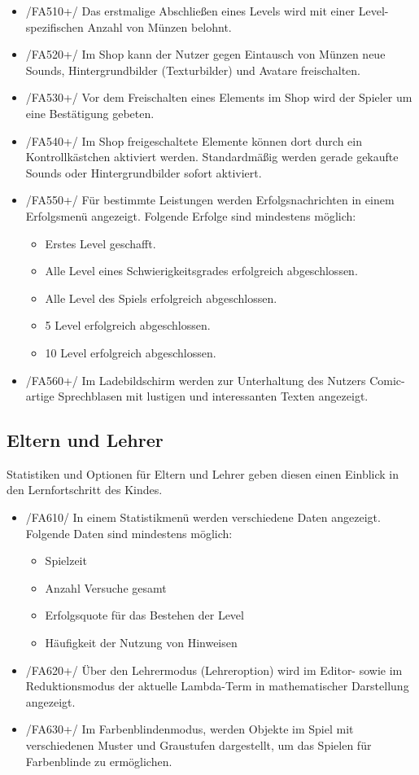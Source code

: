 \begin{itemize}
\item /FA510+/ Das erstmalige Abschließen eines Levels wird mit einer Level-spezifischen Anzahl von Münzen belohnt.
\item /FA520+/ Im Shop kann der Nutzer gegen Eintausch von Münzen neue Sounds, Hintergrundbilder (Texturbilder) und Avatare freischalten.
\item /FA530+/ Vor dem Freischalten eines Elements im Shop wird der Spieler um eine Bestätigung gebeten.
\item /FA540+/ Im Shop freigeschaltete Elemente können dort durch ein Kontrollkästchen aktiviert werden. Standardmäßig werden gerade gekaufte Sounds oder Hintergrundbilder sofort aktiviert.
\item /FA550+/ Für bestimmte Leistungen werden Erfolgsnachrichten in einem Erfolgsmenü angezeigt. Folgende Erfolge sind mindestens möglich:
\begin{itemize}
\item Erstes Level geschafft.
\item Alle Level eines Schwierigkeitsgrades erfolgreich abgeschlossen.
\item Alle Level des Spiels erfolgreich abgeschlossen.
\item 5 Level erfolgreich abgeschlossen.
\item 10 Level erfolgreich abgeschlossen.
\end{itemize}
\item /FA560+/ Im Ladebildschirm werden zur Unterhaltung des Nutzers Comic-artige Sprechblasen mit lustigen und interessanten Texten angezeigt.
\end{itemize}

\subsection{Eltern und Lehrer}

Statistiken und Optionen für Eltern und Lehrer geben diesen einen Einblick in den Lernfortschritt des Kindes.

\begin{itemize}
\item /FA610/ In einem Statistikmenü werden verschiedene Daten angezeigt. Folgende Daten sind mindestens möglich:
\begin{itemize}
\item Spielzeit
\item Anzahl Versuche gesamt
\item Erfolgsquote für das Bestehen der Level
\item Häufigkeit der Nutzung von Hinweisen
\end{itemize}
\item /FA620+/ Über den Lehrermodus (Lehreroption) wird im Editor- sowie im Reduktionsmodus der aktuelle Lambda-Term in mathematischer Darstellung angezeigt.
\item /FA630+/ Im Farbenblindenmodus, werden Objekte im Spiel mit verschiedenen Muster und Graustufen dargestellt, um das Spielen für Farbenblinde zu ermöglichen.
\end{itemize}

